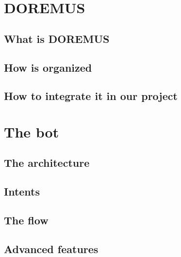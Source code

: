 \documentclass[a4paper,12pt]{report}
\begin{document}
\chapter{DOREMUS}
\section{What is DOREMUS}
\section{How is organized}
\section{How to integrate it in our project}

\chapter{The bot}
\section{The architecture}
\section{Intents}
\section{The flow}
\section{Advanced features}
\end{document}
